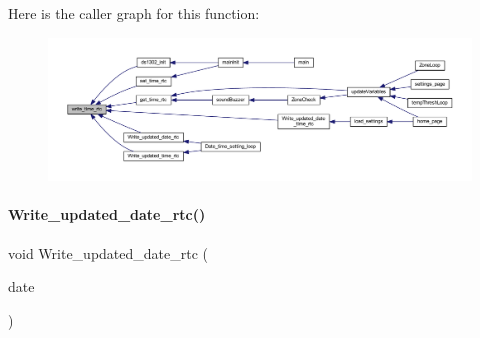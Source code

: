 Here is the caller graph for this function\+:
\nopagebreak
\begin{figure}[H]
\begin{center}
\leavevmode
\includegraphics[width=350pt]{a00017_aadecf4eb7d23c63d1216ced71440654e_icgraph}
\end{center}
\end{figure}
\mbox{\label{a00017_a7ae143903216d08d3f0c07b95e21c21b}} 
\paragraph{Write\+\_\+updated\+\_\+date\+\_\+rtc()}
{\footnotesize\ttfamily void Write\+\_\+updated\+\_\+date\+\_\+rtc (\begin{DoxyParamCaption}\item[{\textbf{ Date\+Time} $\ast$}]{date }\end{DoxyParamCaption})}

